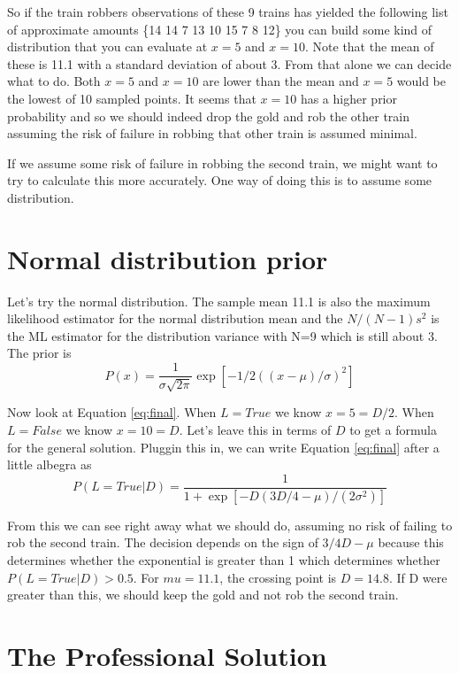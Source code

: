 \documentclass[12pt]{article}
\begin{document}
So if the train robbers observations of these 9 trains has yielded the following list of approximate amounts
\{14 14  7 13 10 15  7  8 12\} you can build some kind of distribution that you can evaluate at $x=5$ and $x=10$. 
Note that the mean of these is 11.1 with a standard deviation of about 3. From that alone we can decide what to
do. Both $x=5$ and $x=10$ are lower than the mean and $x=5$ would be the lowest of 10 sampled points. It seems
that $x=10$ has a higher prior probability and so we should indeed drop the gold and rob the other train
assuming the risk of failure in robbing that other train is assumed minimal. 

If we assume some risk of failure in robbing the second train, we might want to try to calculate this more
accurately. One way of doing this is to assume some distribution. 

\section{Normal distribution prior}

Let's try the normal distribution. The sample mean 11.1 is also the maximum likelihood estimator for the
normal distribution mean and the $N/(N-1) s^2$ is the ML estimator for the distribution variance with N=9 which 
is still about 3.  The prior is 
\begin{equation}
P(x) = \frac{1}{\sigma \sqrt{2 \pi}} \exp\left[ -1/2 ((x-\mu)/\sigma)^2   \right]
\end{equation}

Now look at Equation \ref{eq:final}. When $L=True$ we know $x=5 = D/2$. When $L=False$ we know $x=10 = D$. Let's leave 
this in terms of $D$ to get a formula for the general solution. Pluggin this in, we can 
write Equation \ref{eq:final} after a little albegra as 
\begin{equation}
P(L=True | D) = \frac{1}{1+\exp \left[  -D (3 D/4-\mu)/(2\sigma^2)  \right]}
\label{eq:final}
\end{equation}

From this we can see right away what we should do, assuming no risk of failing to rob the second train. The
decision depends on the sign of $3/4 D - \mu$ because this determines whether the exponential is greater than
1 which determines whether $P(L=True | D) > 0.5$. For $mu=11.1$, the crossing point is $D=14.8$. If D were greater
than this, we should keep the gold and not rob the second train. 

\section{The Professional Solution}
\end{document}

